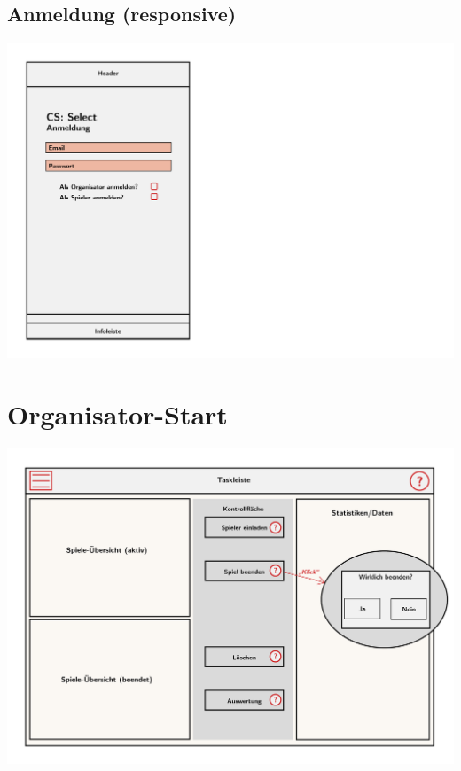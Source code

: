 \documentclass[a4paper]{scrreprt}
\begin{document}
    \subsection{Anmeldung (responsive)}
    \centering
    \includegraphics[width=\textwidth]{../pictures/Anmeldung_responsive.jpg}\\

    \section{Organisator-Start}
    \centering
    \includegraphics[width=\textwidth]{../pictures/2_Organisator.jpg}
\end{document}
